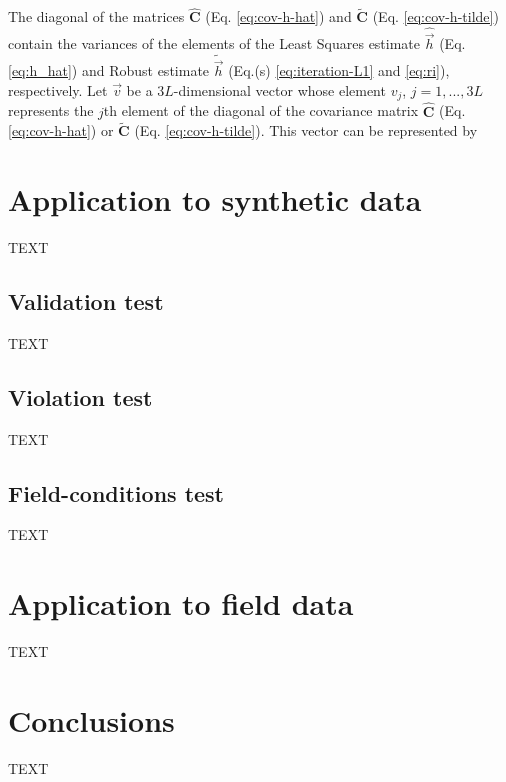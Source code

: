 \documentclass[journal abbreviation, npg]{copernicus}
\begin{document}
The diagonal of the matrices $\hat{\mathbf{C}}$ (Eq. \ref{eq:cov-h-hat}) and $\tilde{\mathbf{C}}$ (Eq. \ref{eq:cov-h-tilde}) contain the variances of the elements of the Least Squares estimate $\hat{\vec{h}}$ (Eq. \ref{eq:h_hat}) and Robust estimate $\tilde{\vec{h}}$ (Eq.(s) \ref{eq:iteration-L1} and \ref{eq:ri}), respectively. Let $\vec{v}$ be a $3L$-dimensional vector whose element $v_{j}$, $j = 1, ..., 3L$ represents the $j$th element of the diagonal of the covariance matrix $\hat{\mathbf{C}}$ (Eq. \ref{eq:cov-h-hat}) or $\tilde{\mathbf{C}}$ (Eq. \ref{eq:cov-h-tilde}). This vector can be represented by


\section{Application to synthetic data}
TEXT

\subsection{Validation test}
TEXT

\subsection{Violation test}
TEXT

\subsection{Field-conditions test}
TEXT

\section{Application to field data}
TEXT

\section{Conclusions}
TEXT


\end{document}
